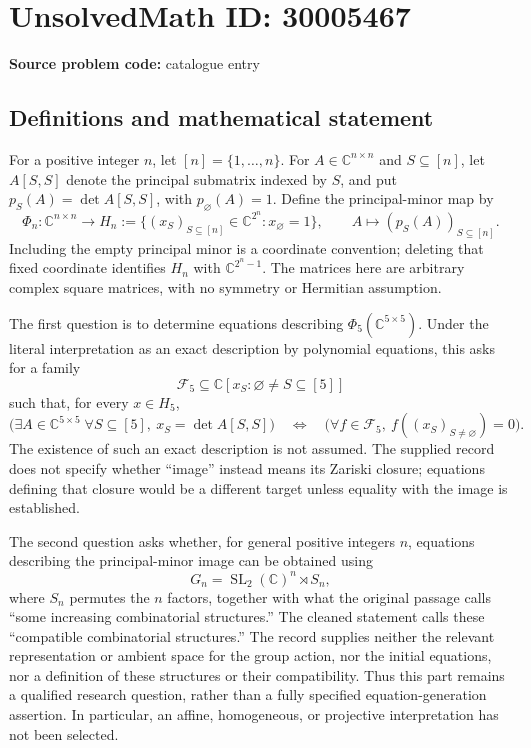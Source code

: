 \documentclass[11pt]{article}
\newcommand{\C}{\mathbb{C}}
\begin{document}
\section*{UnsolvedMath ID: 30005467}
\textbf{Source problem code:} catalogue entry
\subsection{Definitions and mathematical statement}
For a positive integer \(n\), let \([n]=\{1,\ldots,n\}\). For \(A\in\C^{n\times n}\) and \(S\subseteq[n]\), let \(A[S,S]\) denote the principal submatrix indexed by \(S\), and put \(p_S(A)=\det A[S,S]\), with \(p_{\varnothing}(A)=1\). Define the principal-minor map by
\[
\Phi_n:\C^{n\times n}\longrightarrow H_n:=\{(x_S)_{S\subseteq[n]}\in\C^{2^n}:x_{\varnothing}=1\},\qquad A\longmapsto(p_S(A))_{S\subseteq[n]}.
\]
Including the empty principal minor is a coordinate convention; deleting that fixed coordinate identifies \(H_n\) with \(\C^{2^n-1}\). The matrices here are arbitrary complex square matrices, with no symmetry or Hermitian assumption.

The first question is to determine equations describing \(\Phi_5(\C^{5\times5})\). Under the literal interpretation as an exact description by polynomial equations, this asks for a family
\[
\mathcal F_5\subseteq\C[x_S:\varnothing\ne S\subseteq[5]]
\]
such that, for every \(x\in H_5\),
\[
\bigl(\exists A\in\C^{5\times5}\;\forall S\subseteq[5],\ x_S=\det A[S,S]\bigr)
\quad\Longleftrightarrow\quad
\bigl(\forall f\in\mathcal F_5,\ f((x_S)_{S\ne\varnothing})=0\bigr).
\]
The existence of such an exact description is not assumed. The supplied record does not specify whether ``image'' instead means its Zariski closure; equations defining that closure would be a different target unless equality with the image is established.

The second question asks whether, for general positive integers \(n\), equations describing the principal-minor image can be obtained using
\[
G_n=\operatorname{SL}_2(\C)^n\rtimes S_n,
\]
where \(S_n\) permutes the \(n\) factors, together with what the original passage calls ``some increasing combinatorial structures.'' The cleaned statement calls these ``compatible combinatorial structures.'' The record supplies neither the relevant representation or ambient space for the group action, nor the initial equations, nor a definition of these structures or their compatibility. Thus this part remains a qualified research question, rather than a fully specified equation-generation assertion. In particular, an affine, homogeneous, or projective interpretation has not been selected.
\end{document}
